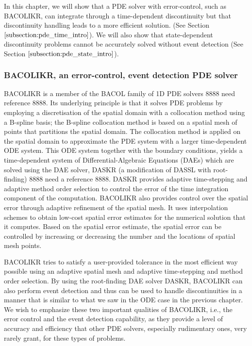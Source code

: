 \documentclass{article}
\begin{document}
In this chapter, we will show that a PDE solver with error-control, such as BACOLIKR, can integrate through a time-dependent discontinuity but that discontinuity handling leads to a more efficient solution.
(See Section $\ref{subsection:pde_time_intro}$). We will also show that state-dependent discontinuity problems cannot be accurately solved without event detection (See Section $\ref{subsection:pde_state_intro}$).

\subsubsection{BACOLIKR, an error-control, event detection PDE solver}
\label{subsection:pde_software}
BACOLIKR is a member of the BACOL family of 1D PDE solvers 8888 need reference 8888. Its underlying principle is that it solves PDE problems  by employing a discretisation of the spatial domain with a collocation method using a B-spline basis; the B-spline collocation method is based on a spatial mesh of points that partitions the spatial domain. The collocation method is applied on the spatial domain to approximate the PDE system with a larger time-dependent ODE system. This ODE system together with the boundary conditions, yields a time-dependent system of Differential-Algebraic Equations (DAEs) which are solved using the DAE solver, DASKR (a modification of DASSL with root-finding) 8888 need a reference 8888. DASKR provides adaptive time-stepping and adaptive method order selection to control the error of the time integration component of the computation. BACOLIKR also provides control over the spatial error through adaptive refinement of the spatial mesh. It uses interpolation schemes to obtain low-cost spatial error estimates for the numerical solution that it computes. Based on the spatial error estimate, the spatial error can be controlled by increasing or decreasing the number and the locations of spatial mesh points.

BACOLIKR tries to satisfy a user-provided tolerance in the most efficient way possible using an adaptive spatial mesh and adaptive time-stepping and method order selection. By using the root-finding DAE solver DASKR, BACOLIKR can also perform event detection and thus can be used to handle discontinuities in a manner that is similar to what we saw in the ODE case in the previous chapter. We wish to emphasize these two important qualities of BACOLIKR, i.e., the error control and the event detection capability, as they provide a level of accuracy and efficiency that other PDE solvers, especially rudimentary ones, very rarely grant, for these types of problems.
\end{document}
